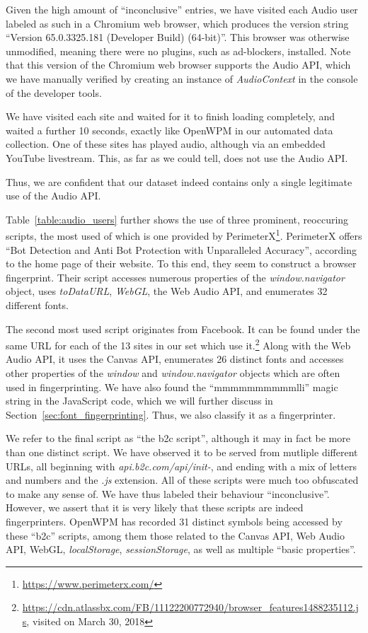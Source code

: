 \documentclass[
    fontsize=12pt,
    headings=small,
    parskip=half,
    bibliography=totoc,
    numbers=noenddot,
    open=any
    ]{scrreprt}
\begin{document}
Given the high amount of ``inconclusive'' entries, we have visited each Audio user labeled as such
in a Chromium web browser, which produces the version string ``Version 65.0.3325.181 (Developer Build) (64-bit)''.
This browser was otherwise unmodified, meaning there were no plugins, such as ad-blockers, installed.
Note that this version of the Chromium web browser supports the Audio API, which we have manually verified
by creating an instance of \textit{AudioContext} in the console of the developer tools.

We have visited each site and waited for it to finish loading completely, and waited a further 10 seconds,
exactly like OpenWPM in our automated data collection.
One of these sites has played audio, although via an embedded YouTube livestream.
This, as far as we could tell, does not use the Audio API.

Thus, we are confident that our dataset indeed contains only a single legitimate use of
the Audio API.

Table~\ref{table:audio_users} further shows the use of three prominent, reoccuring scripts, the most used
of which is one provided by PerimeterX\footnote{\url{https://www.perimeterx.com/}}.
PerimeterX offers ``Bot Detection and Anti Bot Protection with Unparalleled Accuracy'',
according to the home page of their website. To this end, they seem to construct a browser fingerprint.
Their script accesses numerous properties of the \textit{window.navigator} object, uses \textit{toDataURL},
\textit{WebGL}, the Web Audio API, and enumerates 32 different fonts.

The second most used script originates from Facebook. It can be found under the same URL
for each of the 13 sites in our set which use it.\footnote{\url{https://cdn.atlassbx.com/FB/11122200772940/browser_features1488235112.js}, visited on March 30, 2018}
Along with the Web Audio API, it uses the Canvas API, enumerates 26 distinct fonts and accesses other
properties of the \textit{window} and \textit{window.navigator} objects which are often used in fingerprinting.
We have also found the ``mmmmmmmmmmlli'' magic string in the JavaScript code, which we will further discuss
in Section~\ref{sec:font_fingerprinting}.
Thus, we also classify it as a fingerprinter.

We refer to the final script as ``the b2c script'', although it may in fact be more than one distinct
script. We have observed it to be served from mutliple different URLs,
all beginning with \textit{api.b2c.com/api/init-}, and ending with a mix of letters and numbers and the \textit{.js} extension.
All of these scripts were much too obfuscated to make any sense of. We have thus labeled their behaviour ``inconclusive''.
However, we assert that it is very likely that these scripts are indeed fingerprinters.
OpenWPM has recorded 31 distinct symbols being accessed by these ``b2c'' scripts, among them
those related to the Canvas API, Web Audio API, WebGL, \textit{localStorage}, \textit{sessionStorage},
as well as multiple ``basic properties''.
\end{document}
